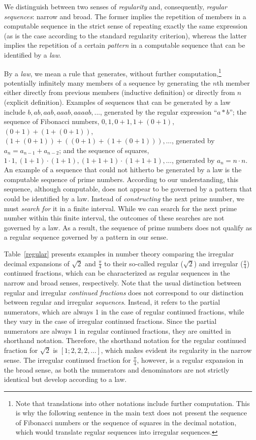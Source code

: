 \documentclass[%
  manuscript=article,   %
  year=2024,
  volume=77,
  doi=10.59203/zfn.77.694,
]{zfn}
\begin{document}
We distinguish between two senses of \emph{regularity} and, consequently, \emph{regular sequences}: narrow and broad. The former implies the repetition of members in a computable sequence in the strict sense of repeating exactly the same expression (as is the case according to the standard regularity criterion), whereas the latter implies the repetition of a certain \emph{pattern} in a computable sequence that can be identified by a \textit{law}.

By a \textit{law}, we mean a rule that generates, without further computation,\footnote{Note that translations into other notations include further computation. This is why the following sentence in the main text does not present the sequence of Fibonacci numbers or the sequence of squares in the decimal notation, which would translate regular sequences into irregular sequences.} potentially infinitely many members of a sequence by generating the $n$th member either directly from previous members (inductive definition) or directly from $n$ (explicit definition).
Examples of sequences that can be generated by a law include $b,ab,aab,aaab,aaaab,...$, generated by the regular expression ``$a{*}b$''; the sequence of Fibonacci numbers, $0,1,0+1,1+(0+1)$, $(0+1)+(1+(0+1))$, $(1+(0+1))+((0+1)+(1+(0+1))),\ldots$, generated by $a_{n} = a_{n-1}+a_{n-2}$; and the sequence of squares, $1\cdot 1,(1+1)\cdot(1+1),(1+1+1)\cdot(1+1+1), \ldots$, generated by $a_{n} = n\cdot n$. An example of a sequence that could not hitherto be generated by a law is the computable sequence of prime numbers. According to our understanding, this sequence, although computable, does not appear to be governed by a pattern that could be identified by a law. Instead of \textit{constructing} the next prime number, we must \textit{search for} it in a finite interval. While we can search for the next prime number within this finite interval, the outcomes of these searches are not governed by a law. As a result, the sequence of prime numbers does not %
qualify as a regular sequence governed by a pattern in our sense.


Table~\ref{regular} presents examples in number theory comparing the irregular decimal expansions of $\sqrt{2}$ and $\frac{\pi}{4}$ to their so-called regular ($\sqrt{2}$) and irregular ($\frac{\pi}{4}$) continued fractions, which can be characterized as regular sequences in the narrow and broad senses, respectively.
Note that the usual distinction between regular and irregular \emph{continued fractions} does not correspond to our distinction between regular and irregular \emph{sequences}. Instead, it refers to the partial numerators, which are always 1 in the case of regular continued fractions, while they vary in the case of irregular continued fractions.
Since the partial numerators are always 1 in regular continued fractions,
they are omitted in shorthand notation. Therefore, the shorthand notation for the regular continued fraction for $\sqrt{2}$ is $[1;2,2,2, \ldots]$, which makes evident its regularity in the narrow sense. The irregular continued fraction for $\frac{\pi}{4}$, however, is a regular expansion in the broad sense, as both the numerators and denominators are not strictly identical but develop according to a law.
\end{document}
